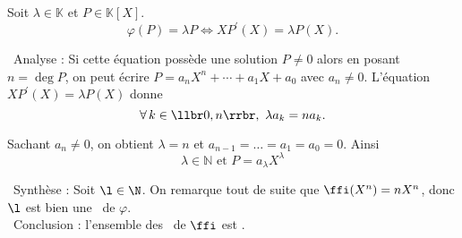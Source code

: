 Soit $\lambda \in \mathbb{K}$ et $P \in \mathbb{K}[X]$.
$$
\varphi(P)=\lambda P \Leftrightarrow X P^{\prime}(X)=\lambda P(X).
$$

\bu\ Analyse :
Si cette équation possède une solution $P \neq 0$ alors en posant $n=\operatorname{deg} P$, on peut écrire $P=a_n X^n+\cdots+a_1 X+a_0$ avec $a_n \neq 0$. L'équation $X P^{\prime}(X)=\lambda P(X)$ donne
$$
\forall\,k\in\llbr 0,n\rrbr,\ \lambda a_k=n a_k.
$$

Sachant $a_n \neq 0$, on obtient $\lambda=n$ et $a_{n-1}=\ldots=a_1=a_0=0$.
Ainsi
$$
\lambda \in \mathbb{N} \text { et } P=a_\lambda X^\lambda
$$

\bu\ Synthèse : Soit $\l\in\N$. On remarque tout de suite que $\ffi(X^n)=nX^n$, donc $\l$ est bien une \valp\ de $\varphi$.\\

\bu\ Conclusion : l'ensemble des \valps\ de $\ffi$ est \N.
